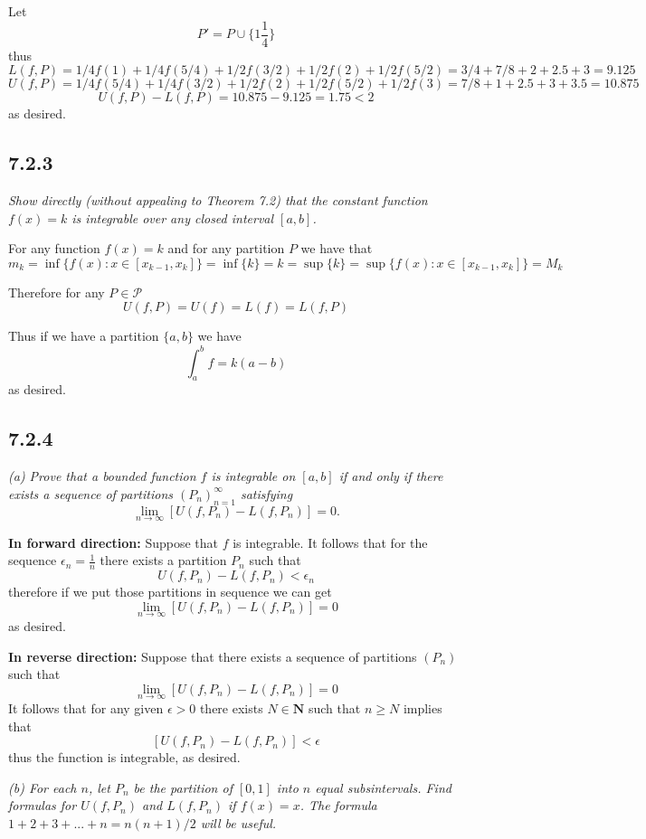 \documentclass[11pt,oneside,titlepage]{book}
\begin{document}
Let
$$P' = P \cup \{1\frac{1}{4}\}$$
thus
$$L(f, P) = 1/4 f(1) + 1/4 f(5/4) + 1/2 f(3/2) + 1/2 f(2) + 1/2 f(5/2) =
3/4 + 7/8 + 2 + 2.5 + 3 = 9.125$$
$$U(f, P) = 1/4 f(5/4) + 1/4 f(3/2) + 1/2 f(2) + 1/2 f(5/2) + 1/2 f(3) =
7/8 + 1 + 2.5 + 3 + 3.5 = 10.875$$
$$U(f, P) - L(f, P) = 10.875 - 9.125 = 1.75 < 2$$
as desired.

\subsection*{7.2.3}
\textit{Show directly (without appealing to Theorem 7.2) that the
  constant function $f(x) = k$ is integrable over any closed interval $[a, b]$.}

For any function $f(x) = k$ and for any partition $P$ we have that 
$$m_k = \inf\{f(x): x \in [x_{k - 1}, x_k]\} = \inf \{k\} = k =
\sup \{k\} = \sup\{f(x): x \in [x_{k - 1}, x_k]\} = M_k$$

Therefore for any $P \in \mathcal{P}$
$$U(f, P) = U(f) = L(f) = L(f, P)$$

Thus if we have a partition $\{a, b\}$ we have
$$\int_a^b{f} = k(a - b)$$
as desired.

\subsection*{7.2.4}

\textit{(a) Prove that a bounded function $f$ is integrable on $[a, b]$ if
  and only if there exists a sequence of partitions $(P_n)_{n = 1}^{\infty}$
  satisfying }
$$\lim_{n \to \infty}{[U(f, P_n) - L(f, P_n)]} = 0.$$

\textbf{In forward direction:} Suppose that $f$ is integrable. It follows that
for the sequence $\epsilon_n = \frac{1}{n}$ there exists a partition
$P_n$ such that
$$U(f, P_n) - L(f, P_n) < \epsilon_n$$
therefore if we put those partitions in sequence we can get
$$\lim_{n \to \infty}{[U(f, P_n) - L(f, P_n)]} = 0$$
as desired.

\textbf{In reverse direction:} Suppose that there exists a sequence of
partitions $(P_n)$ such that
$$\lim_{n \to \infty}{[U(f, P_n) - L(f, P_n)]} = 0$$
It follows that for any given $\epsilon > 0$ there exists $N \in \textbf{N}$
such that $n \geq N$ implies that
$$[U(f, P_n) - L(f, P_n)] < \epsilon$$
thus the function is integrable, as desired.

\textit{(b) For each $n$, let $P_n$ be the partition of $[0, 1]$ into $n$
  equal subsintervals. Find formulas for $U(f, P_n)$ and $L(f, P_n)$ if
  $f(x) = x$. The formula $1 + 2 + 3 + ... + n = n(n + 1)/2$ will be useful.}
\end{document}
